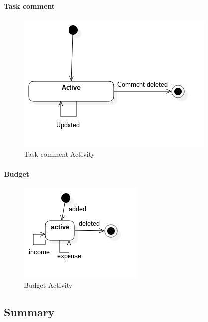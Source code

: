\paragraph{Task comment}

\begin{figure}[H]
    \centering
    \includegraphics[scale=0.7]{Images/ProblemDomain/tcActivityDiagram.png}
    \caption{Task comment Activity}
    \label{fig:tcActivityDiagram}
\end{figure}

\paragraph{Budget}

\begin{figure}[H]
    \centering
    \includegraphics[scale=0.7]{Images/ProblemDomain/budgetActivityDiagram.png}
    \caption{Budget Activity}
    \label{fig:budgetActivityDiagram}
\end{figure}
















\subsection{Summary}

